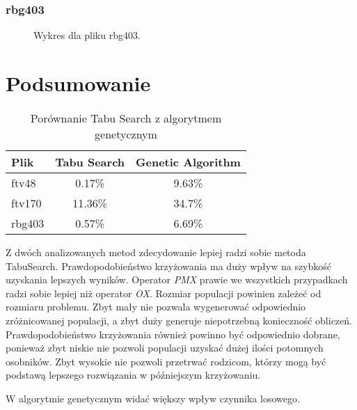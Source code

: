 \documentclass[12pt]{article}
\begin{document}
\subsubsection{rbg403}
\begin{figure}[H]
    \centering
    \caption{Wykres dla pliku rbg403.}
    \label{plot:1}
\end{figure}

\section{Podsumowanie}

\begin{table}[H]
    \centering
    \begin{tabular}{|l|c|c|}
        \hline
        Plik & Tabu Search & Genetic Algorithm\\
        \hline
        ftv48 & 0.17\% & 9.63\% \\
        ftv170 & 11.36\% & 34.7\% \\ 
        rbg403 & 0.57\% & 6.69\%\\
        \hline
    \end{tabular}
    \caption{Porównanie Tabu Search z algorytmem genetycznym}
\end{table}
Z dwóch analizowanych metod zdecydowanie lepiej radzi sobie metoda TabuSearch.
Prawdopodobieństwo krzyżowania ma duży wpływ na szybkość uzyskania lepszych wyników. Operator \textit{PMX} prawie we wszystkich przypadkach
radzi sobie lepiej niż operator \textit{OX}. Rozmiar populacji powinien zależeć od rozmiaru problemu. Zbyt mały nie pozwala wygenerować odpowiednio
zróżnicowanej populacji, a zbyt duży generuje niepotrzebną konieczność obliczeń. Prawdopodobieństwo krzyżowania również powinno być odpowiednio dobrane, ponieważ zbyt niskie nie pozwoli populacji uzyskać dużej ilości potomnych osobników.
Zbyt wysokie nie pozwoli przetrwać rodzicom, którzy mogą być podstawą lepszego rozwiązania w późniejszym krzyżowaniu.

W algorytmie genetycznym widać większy wpływ czynnika losowego.
\end{document}
